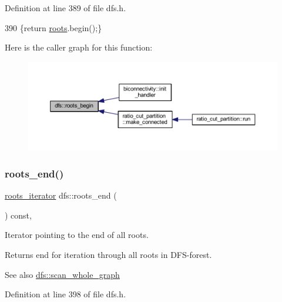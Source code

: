 Definition at line 389 of file dfs.\+h.


\begin{DoxyCode}
390     \{\textcolor{keywordflow}{return} \mbox{\hyperlink{classdfs_a0bbd5cb8df26c891b74dadd84b46a06b}{roots}}.begin();\}
\end{DoxyCode}
Here is the caller graph for this function\+:
\nopagebreak
\begin{figure}[H]
\begin{center}
\leavevmode
\includegraphics[width=350pt]{classdfs_af56fa2b736f0b924dba1257e18ba4b61_icgraph}
\end{center}
\end{figure}
\mbox{\label{classdfs_ae1a61d8c2d8d99059cab410f766ec73f}} 
\subsubsection{\texorpdfstring{roots\+\_\+end()}{roots\_end()}}
{\footnotesize\ttfamily \mbox{\hyperlink{classdfs_a1ea6e8eb2766ac95ac48a8523359065a}{roots\+\_\+iterator}} dfs\+::roots\+\_\+end (\begin{DoxyParamCaption}{ }\end{DoxyParamCaption}) const\hspace{0.3cm}{\ttfamily [inline]}, {\ttfamily [inherited]}}



Iterator pointing to the end of all roots. 

\begin{DoxyReturn}{Returns}
end for iteration through all roots in D\+F\+S-\/forest. 
\end{DoxyReturn}
\begin{DoxySeeAlso}{See also}
\mbox{\hyperlink{classdfs_aa7c864a6f3a120720138b187b3ed95b5}{dfs\+::scan\+\_\+whole\+\_\+graph}} 
\end{DoxySeeAlso}


Definition at line 398 of file dfs.\+h.


